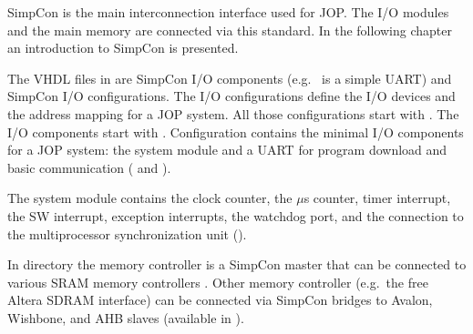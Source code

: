 SimpCon \cite{simpcon} is the main interconnection interface used for
JOP. The I/O modules and the main memory are connected via this
standard. In the following chapter an introduction to SimpCon is
presented.

The VHDL files in  are SimpCon I/O components
(e.g.\  is a simple UART) and SimpCon I/O
configurations. The I/O configurations define the I/O devices and the
address mapping for a JOP system. All those configurations start with
. The I/O components start with .
Configuration  contains the minimal I/O components
for a JOP system: the system module  and a UART
 for program download and basic communication
( and ).

The system module  contains the clock counter, the
$\mu$s counter, timer interrupt, the SW interrupt, exception
interrupts, the watchdog port, and the connection to the
multiprocessor synchronization unit ().

In directory  the memory controller
 is a SimpCon master that can be connected to
various SRAM memory controllers . Other memory
controller (e.g.\ the free Altera SDRAM interface) can be connected
via SimpCon bridges to Avalon, Wishbone, and AHB slaves (available in
).
